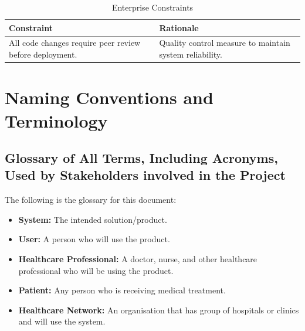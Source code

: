 \documentclass[12pt]{article}
\begin{document}
\begin{table}[H]
\centering
\begin{tabular}{|p{6cm}|p{6cm}|}
\hline
\textbf{Constraint} & \textbf{Rationale} \\
\hline
All code changes require peer review before deployment. & Quality control measure to maintain system reliability. \\
\hline
\end{tabular}
\caption{Enterprise Constraints}
\label{tab:enterprise_constraints}
\end{table}

\section{Naming Conventions and Terminology}

\subsection{Glossary of All Terms, Including Acronyms, Used by Stakeholders
involved in the Project}
The following is the glossary for this document:
\begin{itemize}
  \item \textbf{System:} The intended solution/product.
  \item \textbf{User:} A person who will use the product.
  \item \textbf{Healthcare Professional:} A doctor, nurse, and other healthcare professional who will be using the product.
  \item \textbf{Patient:} Any person who is receiving medical treatment.
  \item \textbf{Healthcare Network:} An organisation that has group of hospitals or clinics and will use the system.
\end{itemize}
\end{document}
